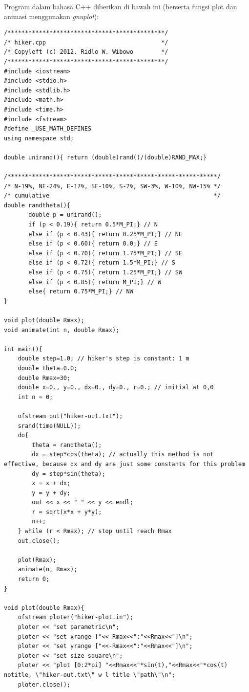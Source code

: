 \documentclass[paper=a4, fontsize=11pt]{scrartcl}
\numberwithin{equation}{section} %
\numberwithin{figure}{section} %
\numberwithin{table}{section} %
\begin{document}
Program dalam bahasa C++ diberikan di bawah ini (berserta fungsi plot dan animasi menggunakan \textit{gnuplot}):
\lstset{frameround=fttt}
\begin{lstlisting}
/*********************************************/
/* hiker.cpp                                 */
/* Copyleft (c) 2012. Ridlo W. Wibowo        */
/*********************************************/
#include <iostream>
#include <stdio.h>
#include <stdlib.h>
#include <math.h>
#include <time.h>
#include <fstream>
#define _USE_MATH_DEFINES
using namespace std;

double unirand(){ return (double)rand()/(double)RAND_MAX;}

/************************************************************/
/* N-19%, NE-24%, E-17%, SE-10%, S-2%, SW-3%, W-10%, NW-15% */
/* cumulative                                               */
double randtheta(){
       double p = unirand();
       if (p < 0.19){ return 0.5*M_PI;} // N
       else if (p < 0.43){ return 0.25*M_PI;} // NE
       else if (p < 0.60){ return 0.0;} // E
       else if (p < 0.70){ return 1.75*M_PI;} // SE 
       else if (p < 0.72){ return 1.5*M_PI;} // S
       else if (p < 0.75){ return 1.25*M_PI;} // SW
       else if (p < 0.85){ return M_PI;} // W
       else{ return 0.75*M_PI;} // NW
}

void plot(double Rmax);
void animate(int n, double Rmax);

int main(){
    double step=1.0; // hiker's step is constant: 1 m
    double theta=0.0;
    double Rmax=30;
    double x=0., y=0., dx=0., dy=0., r=0.; // initial at 0,0
    int n = 0;

    ofstream out("hiker-out.txt");
    srand(time(NULL));
    do{
        theta = randtheta();
        dx = step*cos(theta); // actually this method is not effective, because dx and dy are just some constants for this problem
        dy = step*sin(theta);
        x = x + dx; 
        y = y + dy;
        out << x << " " << y << endl;
        r = sqrt(x*x + y*y);
        n++;
    } while (r < Rmax); // stop until reach Rmax
    out.close();

    plot(Rmax);
    animate(n, Rmax);
    return 0;
}

void plot(double Rmax){
    ofstream ploter("hiker-plot.in");
    ploter << "set parametric\n";
    ploter << "set xrange ["<<-Rmax<<":"<<Rmax<<"]\n";
    ploter << "set yrange ["<<-Rmax<<":"<<Rmax<<"]\n";
    ploter << "set size square\n";
    ploter << "plot [0:2*pi] "<<Rmax<<"*sin(t),"<<Rmax<<"*cos(t) notitle, \"hiker-out.txt\" w l title \"path\"\n";
    ploter.close();


\end{lstlisting}
\end{document}
